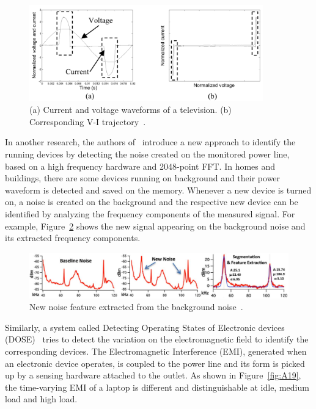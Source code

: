 \begin{figure}
\centering
\includegraphics[width=0.9\textwidth]{./chapters/chapter2/images/VItrajectory.pdf} 
\caption{(a) Current and voltage waveforms of a television. (b) Corresponding V-I trajectory~\cite{Lam07}.} 
\label{fig:A17} 
\end{figure}

In another research, the authors of~\cite{Gupta10} introduce a new approach to identify the running devices by detecting the noise created on the monitored power line, based on a high frequency hardware and 2048-point FFT. In homes and buildings, there are some devices running on background and their power waveform is detected and saved on the memory. Whenever a new device is turned on, a noise is created on the background and the respective new device can be identified by analyzing the frequency components of the measured signal. For example, Figure~\ref{fig:A18} shows the new signal appearing on the background noise and its extracted frequency components. 
\begin{figure}
\centering
\includegraphics[width=1\textwidth]{./chapters/chapter2/images/noiseEMI.pdf} 
\caption{New noise feature extracted from the background noise~\cite{Gupta10}.} 
\label{fig:A18} 
\end{figure}

Similarly, a system called Detecting Operating States of Electronic devices (DOSE)~\cite{Chen15} tries to detect the variation on the electromagnetic field to identify the corresponding devices. The Electromagnetic Interference (EMI), generated when an electronic device operates, is coupled to the power line and its form is picked up by a sensing hardware attached to the outlet. As shown in Figure~\ref{fig:A19}, the time-varying EMI of a laptop is different and distinguishable at idle, medium load and high load.

